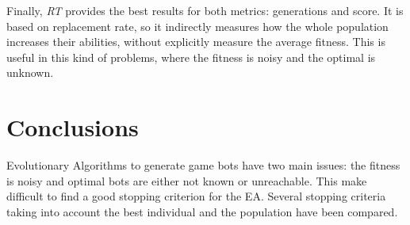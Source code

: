 \documentclass[runningheads,a4paper]{llncs}
\begin{document}
Finally, \textit{RT} provides the best results for both metrics: generations and score. It is based on replacement rate, so it indirectly measures how the whole population increases their abilities, without explicitly measure the average fitness. This is useful in this kind of problems, where the fitness is noisy and the optimal is unknown.





%
\section{Conclusions}




Evolutionary Algorithms to generate game bots have two main issues: the fitness is noisy and optimal bots are either not known or unreachable. This make difficult to find a good stopping criterion for the EA. Several stopping criteria taking into account the best individual and the population have been compared. 
\end{document}
